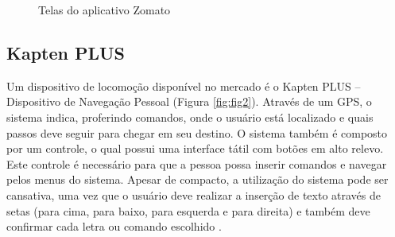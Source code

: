 \begin{figure}[H]
    \centering
    \caption[Ferramenta Zomato]{Telas do aplicativo Zomato}
    \label{fig:zomato1}
        \qquad
        \qquad
\end{figure}

\subsection{Kapten PLUS}
Um dispositivo de locomoção disponível no mercado é o Kapten PLUS -- Dispositivo de Navegação Pessoal (Figura \ref{fig:fig2}). Através de um GPS, o sistema indica, proferindo comandos, onde o usuário está localizado e quais passos deve seguir para chegar em seu destino. O sistema também é composto por um controle, o qual possui uma interface tátil com botões em alto relevo. Este controle é necessário para que a pessoa possa inserir comandos e navegar pelos menus do sistema. Apesar de compacto, a utilização do sistema pode ser cansativa, uma vez que o usuário deve realizar a inserção de texto através de setas (para cima, para baixo, para esquerda e para direita) e também deve confirmar cada letra ou comando escolhido \cite{KAPTEN}.


